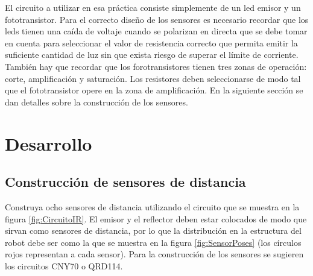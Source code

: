 \documentclass[a4paper,12pt]{article}
\begin{document}
El circuito a utilizar en esa práctica consiste simplemente de un led emisor y un fototransistor. Para el correcto diseño de los sensores es necesario recordar que los leds tienen una caída de voltaje cuando se polarizan en directa que se debe tomar en cuenta para seleccionar el valor de resistencia correcto que permita emitir la suficiente cantidad de luz sin que exista riesgo de superar el límite de corriente. También hay que recordar que los forotransistores tienen tres zonas de operación: corte, amplificación y saturación. Los resistores deben seleccionarse de modo tal que el fototransistor opere en la zona de amplificación. En la siguiente sección se dan detalles sobre la construcción de los sensores. 

\section{Desarrollo}
\subsection{Construcción de sensores de distancia}
Construya ocho sensores de distancia utilizando el circuito que se muestra en la figura \ref{fig:CircuitoIR}. El emisor y el reflector deben estar colocados de modo que sirvan como sensores de distancia, por lo que la distribución en la estructura del robot debe ser como la que se muestra en la figura \ref{fig:SensorPoses} (los círculos rojos representan a cada sensor). Para la construcción de los sensores se sugieren los circuitos CNY70 o QRD114. 
\end{document}
